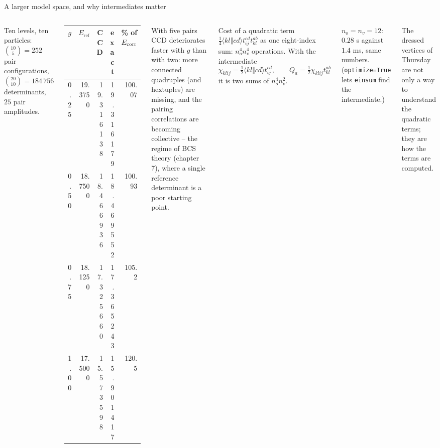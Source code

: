 \documentclass[aspectratio=169,10pt]{beamer}
\newcommand{\numbox}[1]{%
  \begin{tcolorbox}[colback=palegreen,colframe=teal!70!black,title={\bfseries Measured}]
  #1
  \end{tcolorbox}}
\newcommand{\Eref}{E_{\mathrm{ref}}}
\newcommand{\as}[4]{\langle #1#2\Vert #3#4\rangle}
\begin{document}
\begin{frame}[shrink=3]{A larger model space, and why intermediates matter}
\small
\begin{columns}[T]
Ten levels, ten particles: $\binom{10}{5}=252$ pair configurations, $\binom{20}{10}=184\,756$ determinants, $25$ pair amplitudes.
\begin{center}
\footnotesize\renewcommand{\arraystretch}{1.15}
\begin{tabular}{rrrrr}
\toprule
$g$ & $\Eref$ & CCD & exact & \% of $E_{\rm corr}$\\
\midrule
0.25 & 19.3750 & 19.316138 & 19.316179 & 100.07\\
0.50 & 18.7500 & 18.466936 & 18.469552 & 100.93\\
0.75 & 18.1250 & 17.325660 & 17.365243 & 105.2\\
1.00 & 17.5000 & 15.573598 & 15.901417 & 120.5\\
\bottomrule
\end{tabular}
\end{center}
With five pairs CCD deteriorates faster with $g$ than with two: more connected quadruples (and hextuples) are missing, and the pairing correlations are becoming collective -- the regime of BCS theory (chapter 7), where a single reference determinant is a poor starting point.
\begin{block}{Cost of a quadratic term}
$\tfrac14\as klcd t_{ij}^{cd}t_{kl}^{ab}$ as one eight-index sum: $n_o^4n_v^4$ operations. With the intermediate
\[
 \chi_{klij}=\tfrac12\as klcd t_{ij}^{cd},\qquad Q_a=\tfrac12\chi_{klij}t_{kl}^{ab}
\]
it is two sums of $n_o^4n_v^2$.
\end{block}
\numbox{\small $n_o=n_v=12$: $0.28$ s against $1.4$ ms, same numbers. (\texttt{optimize=True} lets \texttt{einsum} find the intermediate.)}
The dressed vertices of Thursday are not only a way to understand the quadratic terms; they are how the terms are computed.
\end{columns}
\end{frame}
\end{document}
